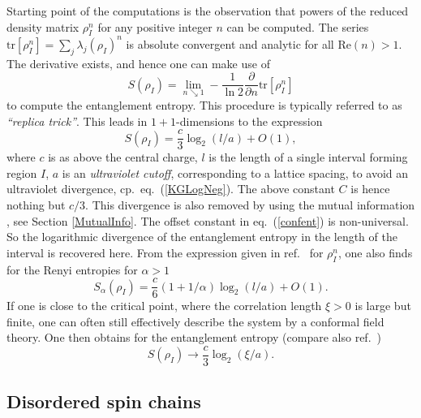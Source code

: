 \documentclass[rmp,twocolumn,floatfix,epsfig,graphics]{revtex4} %
\begin{document}
Starting point of the computations is the observation that powers 
of the reduced density matrix $\rho_I^n$ for any positive integer 
$n$ can be computed. The series 
$\text{tr}[\rho_I^n]= \sum_j \lambda_j(\rho_I)^n$ 
is absolute convergent and analytic for all
$\text{Re}(n)>1$. The derivative exists, and hence one can make use of
\begin{equation*}
        S(\rho_I)=\lim_{n\searrow 1}
        -\frac{1}{\ln 2} \frac{\partial}{\partial n}\text{tr}[\rho_I^n]
\end{equation*}
to compute the entanglement entropy. This procedure is 
typically referred to as {\it ``replica trick''}.
This leads in $1+1$-dimensions to the expression \cite{Larsen}
\begin{equation}
        \label{confent}
        S(\rho_I) = \frac{c}{3}\log_2(l/a)
        +O(1),
\end{equation}
where $c$ is as above the central charge, $l$ is the length of a 
single interval forming region $I$, $a$ is an {\it ultraviolet cutoff}, 
corresponding to a lattice spacing, to avoid an ultraviolet 
divergence, cp.\ eq.\ (\ref{KGLogNeg}). The above
constant $C$ is hence nothing but $c/3$.
This divergence is also removed by using the mutual 
information \cite{Casini}, see Section \ref{MutualInfo}. The 
offset constant in eq.\ (\ref{confent}) is non-universal.  So 
the logarithmic divergence of the entanglement entropy in the 
length of the interval is recovered here. From the expression given 
in ref.\ \cite{Calabrese} for $\rho_I^n$, one also finds for the 
Renyi entropies for $\alpha>1$
\begin{equation*}
        S_\alpha (\rho_I) = \frac{c}{6}\left(1+1/\alpha \right)\log_2(l/a) +O(1).
\end{equation*}
If one is close to the critical point, where the correlation 
length $\xi>0$ is large but finite, one can often still effectively 
describe the system by a conformal field theory. One then obtains
for the entanglement entropy \cite{Calabrese} 
(compare also ref.\ \cite{HuertaJSTAT})
\begin{equation*}
        S(\rho_I) \rightarrow \frac{c}{3} \log_2(\xi/a).
\end{equation*}

\subsection{Disordered spin chains}
\end{document}
